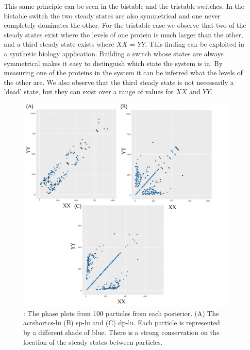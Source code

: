 This same principle can be seen in the bistable and the tristable switches. In the bistable switch the two steady states are also symmetrical and one never completely dominates the other. For the tristable case we observe that two of the steady states exist where the levels of one protein is much larger than the other, and a third steady state exists where $XX$ = $YY$. This finding can be exploited in a synthetic biology application. Building a switch whose states are always symmetrical makes it easy to distinguish which state the system is in. By measuring one of the proteins in the system it can be inferred what the levels of the other are. We also observe that the third steady state is not necessarily a 'dead' state, but they can exist over a range of values for $XX$ and $YY$.

\begin{figure}[bp]
	\begin{center}
		\includegraphics[width=\textwidth]{../../chapters/chapterStabilityFinder/images/LU-234-phase-all.png}
		\caption[Phase plots of multistable switches]{ \label{fig:lu_234_phase}: The phase plots from 100 particles from each posterior. (A) The \\acrshort{cs-lu} (B) \acrshort{sp-lu} and (C) \acrshort{dp-lu}. Each particle is represented by a different shade of blue. There is a strong conservation on the location of the steady states between particles.  }
	\end{center}
\end{figure}

